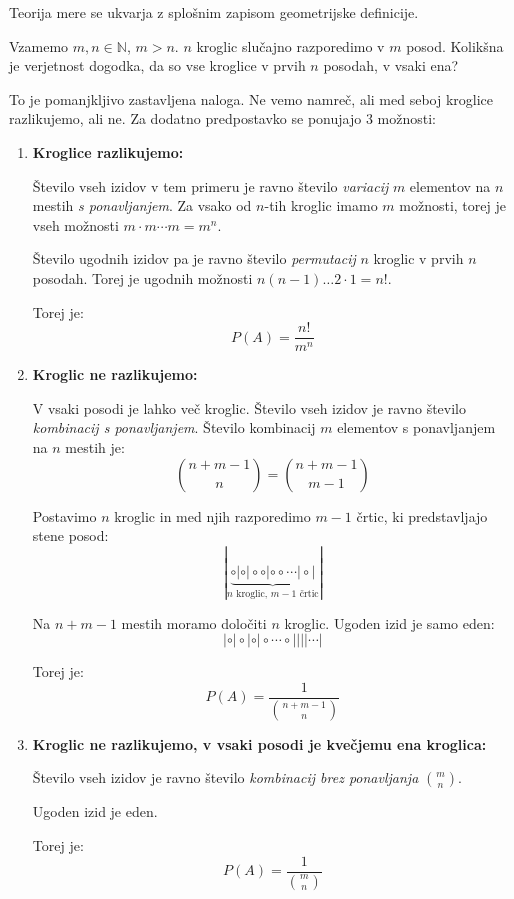 \documentclass[12pt]{book}
\def\n{\noindent}
\theoremstyle{definition}
\theoremstyle{plain}
\theoremstyle{plain}
\theoremstyle{plain}
\theoremstyle{remark}
\begin{document}
\n Teorija mere se ukvarja z splošnim zapisom geometrijske definicije. 

\begin{zgled}
    Vzamemo $m, n \in \mathbb{N}$, $m>n$. $n$ kroglic slučajno razporedimo v $m$ posod. Kolikšna je verjetnost dogodka, da so vse kroglice v prvih $n$ posodah, v vsaki ena?

    To je pomanjkljivo zastavljena naloga. Ne vemo namreč, ali med seboj kroglice razlikujemo, ali ne. Za dodatno predpostavko se ponujajo 3 možnosti: 
    \begin{enumerate}
        \item \textbf{Kroglice razlikujemo:}
        
        Število vseh izidov v tem primeru je ravno število \emph{variacij} $m$ elementov na $n$ mestih \emph{s ponavljanjem}. Za vsako od $n$-tih kroglic imamo $m$ možnosti, torej je vseh možnosti $m \cdot m \cdots m=m^n$.
        
        Število ugodnih izidov pa je ravno število \emph{permutacij} $n$ kroglic v prvih $n$ posodah. Torej je ugodnih možnosti $n(n-1) \ldots 2 \cdot 1=n!$.
        
        Torej je:
        $$
        P(A)=\frac{n !}{m^n}
        $$

        \item \textbf{Kroglic ne razlikujemo:} 
        
        V vsaki posodi je lahko več kroglic. Število vseh izidov je ravno število \emph{kombinacij s ponavljanjem}. Število kombinacij $m$ elementov s ponavljanjem na $n$ mestih je: 
        $$
        \binom{n+m-1}{n} = \binom{n+m-1}{m-1}
        $$

        \newpage

        Postavimo $n$ kroglic in med njih razporedimo $m-1$ črtic, ki predstavljajo stene posod:
        $$
        |\underbrace{\circ|\circ|\circ\circ |\circ\circ  \cdots |\circ |}_{n \text{ kroglic, } m-1 \text{ črtic}}|
        $$

        Na $n+m-1$ mestih moramo določiti $n$ kroglic. Ugoden izid je samo eden: 
        $$
        |\circ|\circ|\circ|\circ \cdots \circ|||| \cdots |
        $$

        Torej je:
        $$
        P(A)=\frac{1}{\binom{n+m-1}{n}}
        $$

        \item \textbf{Kroglic ne razlikujemo, v vsaki posodi je kvečjemu ena kroglica:} 
        
        Število vseh izidov je ravno število \emph{kombinacij brez ponavljanja} $\binom{m}{n}$. 
        
        Ugoden izid je eden. 

        Torej je:
        $$
        P(A)=\frac{1}{\binom{m}{n}}
        $$
    \end{enumerate}
\end{zgled}
\end{document}
